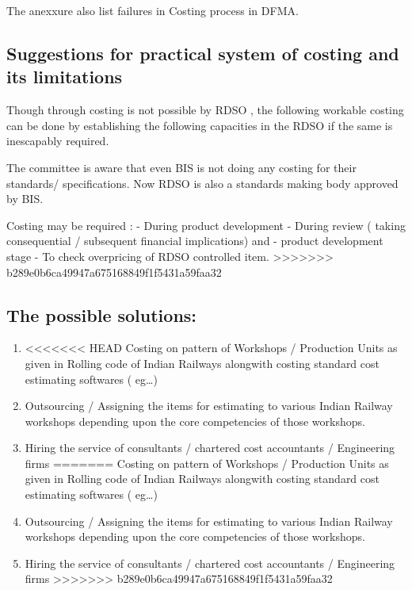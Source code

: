 \documentclass[
  11pt,
  twoside]{article}
\begin{document}
The anexxure also list failures in Costing process
in DFMA.

\hypertarget{suggestions-for-practical-system-of-costing-and-its-limitations}{%
\subsection{Suggestions for practical system of costing and its limitations}\label{suggestions-for-practical-system-of-costing-and-its-limitations}}

Though through costing is not possible by RDSO , the following workable costing can be done by establishing the following capacities in the RDSO if the same is inescapably required.

The committee is aware that even BIS is not doing any costing for their standards/ specifications. Now RDSO is also a standards making body approved by BIS.

Costing may be required :
- During product development
- During review ( taking consequential / subsequent financial implications) and
- product development stage
- To check overpricing of RDSO controlled item.
>>>>>>> b289e0b6ca49947a675168849f1f5431a59faa32

\hypertarget{the-possible-solutions}{%
\subsection{The possible solutions:}\label{the-possible-solutions}}

\begin{enumerate}
\def\labelenumi{\arabic{enumi}.}
\item
<<<<<<< HEAD
  Costing on pattern of Workshops / Production Units as given in Rolling
  code of Indian Railways alongwith costing standard cost estimating
  softwares ( eg\ldots)
\item
  Outsourcing / Assigning the items for estimating to various Indian
  Railway workshops depending upon the core competencies of those
  workshops.
\item
  Hiring the service of consultants / chartered cost accountants /
  Engineering firms
=======
  Costing on pattern of Workshops / Production Units as given in Rolling code of Indian Railways alongwith costing standard cost estimating softwares ( eg\ldots)
\item
  Outsourcing / Assigning the items for estimating to various Indian Railway workshops depending upon the core competencies of those workshops.
\item
  Hiring the service of consultants / chartered cost accountants / Engineering firms
>>>>>>> b289e0b6ca49947a675168849f1f5431a59faa32
\end{enumerate}
\end{document}
